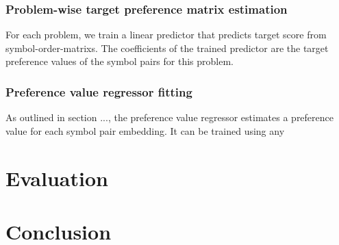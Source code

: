 \subsubsection{Problem-wise target preference matrix estimation}

For each problem,
we train a linear predictor
that predicts target score from \glspl{symbol-order-matrix}.
The coefficients of the trained predictor are the target preference values of the symbol pairs for this problem.

\subsubsection{Preference value regressor fitting}

As outlined in section ...,
the preference value regressor estimates a preference value for each symbol pair embedding.
It can be trained using any 

\section{Evaluation}
\label{sec:evaluation}

\section{Conclusion}

\glsaddall
\printglossaries





